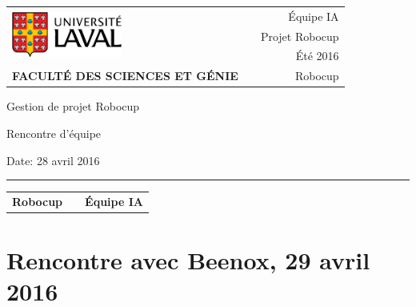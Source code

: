 \documentclass[12pt,letterpaper,twoside]{article}
\begin{document}
\setcounter{secnumdepth}{0}
\begin{titlepage}

        \vspace*{1cm}
        \begin{small}
        \begin{tabularx}{\textwidth}{ l X r }
        \multirow{3}{*}{\includegraphics[height=1.5cm,keepaspectratio]{ul_logo.pdf}}
        && \'Equipe IA\\
        && Projet Robocup\\
        && Été 2016\\

        \scriptsize{\textbf{FACULTÉ DES SCIENCES ET GÉNIE}} && Robocup
        \end{tabularx}
        \end{small}

        \vfill

        \begin{center}

        Gestion de projet Robocup

        \vspace{0.5cm}

        Rencontre d'\'equipe

        \vspace{2cm}

        \end{center}

        \vfill

        Date: 28 avril 2016

        \vspace{0.4cm}

        \rule{\textwidth}{2pt}

        \vspace{0.3cm}

        \begin{tabularx}{\textwidth}{ l X r }

        \textbf{Robocup} && \textbf{\'Equipe IA} \\

        \end{tabularx}


\end{titlepage}


\section*{Rencontre avec Beenox, 29 avril 2016}
\end{document}
